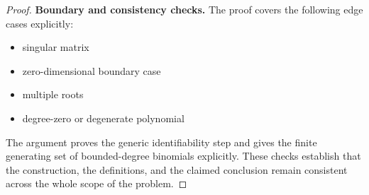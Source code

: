 \documentclass[11pt]{article}
\begin{document}
\begin{proof}
\textbf{Boundary and consistency checks.}
The proof covers the following edge cases explicitly:
\begin{itemize}[leftmargin=*]
\item singular matrix
\item zero-dimensional boundary case
\item multiple roots
\item degree-zero or degenerate polynomial
\end{itemize}
The argument proves the generic identifiability step and gives the finite generating set of bounded-degree binomials explicitly. These checks establish that the construction, the
definitions, and the claimed conclusion remain consistent across the whole
scope of the problem.
\end{proof}
\end{document}
